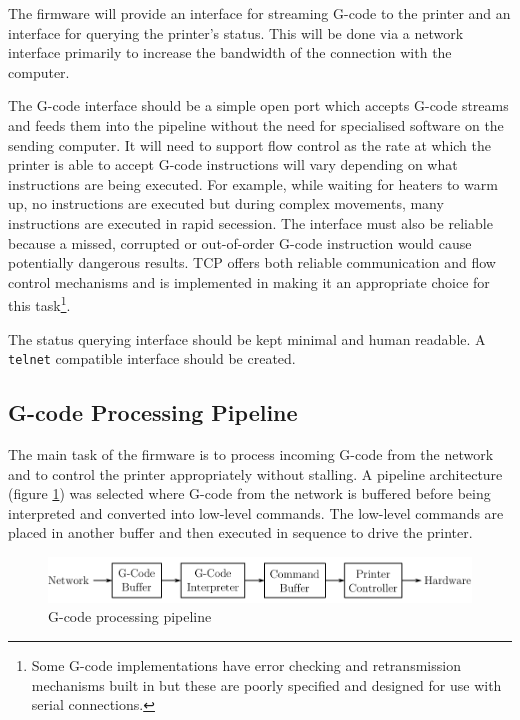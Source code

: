 			The firmware will provide an interface for streaming G-code to the printer
			and an interface for querying the printer's status. This will be done via
			a network interface primarily to increase the bandwidth of the connection
			with the computer.
			
			The G-code interface should be a simple open port which accepts G-code
			streams and feeds them into the pipeline without the need for specialised
			software on the sending computer. It will need to support flow control as
			the rate at which the printer is able to accept G-code instructions will
			vary depending on what instructions are being executed. For example, while
			waiting for heaters to warm up, no instructions are executed but during
			complex movements, many instructions are executed in rapid secession.  The
			interface must also be reliable because a missed, corrupted or
			out-of-order G-code instruction would cause potentially dangerous results.
			TCP offers both reliable communication and flow control mechanisms and is
			implemented in \uIP{} making it an appropriate choice for this
			task\footnote{Some G-code implementations have error checking and
			retransmission mechanisms built in but these are poorly specified and
			designed for use with serial connections.}.
			
			The status querying interface should be kept minimal and human readable. A
			\verb|telnet| compatible interface should be created.
		
		\subsection{G-code Processing Pipeline}
			
			The main task of the firmware is to process incoming G-code from the
			network and to control the printer appropriately without stalling. A
			pipeline architecture (figure \ref{fig:firmwarePipeline}) was selected
			where G-code from the network is buffered before being interpreted and
			converted into low-level commands. The low-level commands are placed in
			another buffer and then executed in sequence to drive the printer.
			
			\begin{figure}
				\includegraphics[width=1\textwidth]{diagrams/firmwarePipeline.pdf}
				\caption{G-code processing pipeline}
				\label{fig:firmwarePipeline}
			\end{figure}
			
